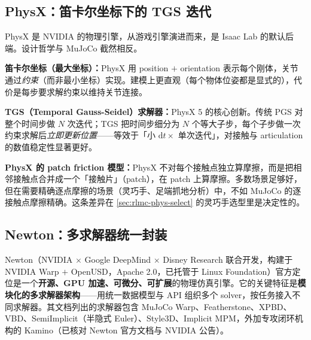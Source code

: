 \subsection{PhysX：笛卡尔坐标下的 TGS 迭代}
\label{sec:rlmc-phys-physx}

PhysX 是 NVIDIA 的物理引擎，从游戏引擎演进而来，是 Isaac Lab 的默认后端。设计哲学与 MuJoCo 截然相反。

\textbf{笛卡尔坐标（最大坐标）：}PhysX 用 position $+$ orientation 表示每个刚体，关节通过\emph{约束}（而非最小坐标）实现。建模上更直观（每个物体位姿都是显式的），代价是每步要求解约束以维持关节连接。

\textbf{TGS（Temporal Gauss-Seidel）求解器：}PhysX 5 的核心创新。传统 PGS 对整个时间步做 $N$ 次迭代；TGS 把时间步细分为 $N$ 个等大子步，每个子步做一次约束求解后\emph{立即更新位置}——等效于「小 $\mathrm dt\times$ 单次迭代」，对接触与 articulation 的数值稳定性显著更好。


\textbf{PhysX 的 patch friction 模型：}PhysX 不对每个接触点独立算摩擦，而是把相邻接触点合并成一个「接触片」（patch），在 patch 上算摩擦。多数场景足够好，但在需要精确逐点摩擦的场景（灵巧手、足端抓地分析）中，不如 MuJoCo 的逐接触点摩擦精确。这条差异在 \cref{sec:rlmc-phys-select} 的灵巧手选型里是决定性的。

\subsection{Newton：多求解器统一封装}
\label{sec:rlmc-phys-newton}

Newton（NVIDIA $\times$ Google DeepMind $\times$ Disney Research 联合开发，构建于 NVIDIA Warp $+$ OpenUSD，Apache 2.0，已托管于 Linux Foundation）官方定位是一个\textbf{开源、GPU 加速、可微分、可扩展}的物理仿真引擎\cite{newton2026}。它的关键特征是\textbf{模块化的多求解器架构}——用统一数据模型与 API 组织多个 solver，按任务接入不同求解器。其文档列出的求解器包含 MuJoCo Warp、Featherstone、XPBD、VBD、SemiImplicit（半隐式 Euler）、Style3D、Implicit MPM，外加专攻闭环机构的 Kamino（已核对 Newton 官方文档与 NVIDIA 公告）。

